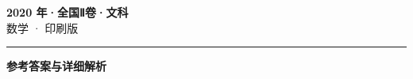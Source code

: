 \documentclass[zihao=5, a4paper]{ctexart}
\begin{document}
\begin{center}
  {\Large\bfseries 2020 年·全国Ⅱ卷·文科}\\[4pt]
  {\large 数学 · 印刷版}
\end{center}
\medskip
{}

\par\bigskip\hrule\bigskip
{}
\Needspace{0.55\textheight}
\begin{center}{\large\bfseries 参考答案与详细解析}\end{center}
\smallskip

\end{document}
